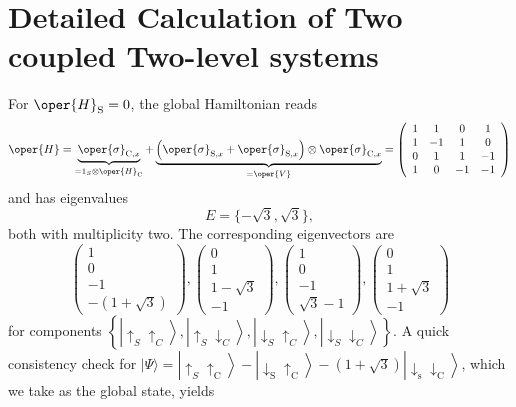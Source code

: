 \chapter{Detailed Calculation of Two coupled Two-level systems\label{app:chap3_appendix}}
For $\oper{H}_{\mathrm{S}}=0$, the global Hamiltonian reads
$$
\oper{H}=\underbrace{\oper{\sigma}_{\mathrm{C}, x}}_{=1_S \otimes \oper{H}_{\mathrm{C}}}+\underbrace{\left(\oper{\sigma}_{\mathrm{S}, x}+\oper{\sigma}_{\mathrm{S}, x}\right) \otimes \oper{\sigma}_{\mathrm{C}, x}}_{=\oper{V}}=\left(\begin{array}{cccc}
1 & 1 & 0 & 1 \\
1 & -1 & 1 & 0 \\
0 & 1 & 1 & -1 \\
1 & 0 & -1 & -1
\end{array}\right)
$$
and has eigenvalues
$$
E=\{-\sqrt{3}, \sqrt{3}\},
$$
both with multiplicity two. The corresponding eigenvectors are
$$
\left(\begin{array}{c}
1 \\
0 \\
-1 \\
-(1+\sqrt{3})
\end{array}\right),\left(\begin{array}{c}
0 \\
1 \\
1-\sqrt{3} \\
-1
\end{array}\right),\left(\begin{array}{c}
1 \\
0 \\
-1 \\
\sqrt{3}-1
\end{array}\right),\left(\begin{array}{c}
0 \\
1 \\
1+\sqrt{3} \\
-1
\end{array}\right)
$$
for components $\left\{\left|\uparrow_S \uparrow_C\right\rangle,\left|\uparrow_S \downarrow_C\right\rangle,\left|\downarrow_S \uparrow_C\right\rangle,\left|\downarrow_S \downarrow_C\right\rangle\right\}$. A quick consistency check for $|\Psi\rangle=\left|\uparrow_S \uparrow_{\mathrm{C}}\right\rangle-\left|\downarrow_{\mathrm{S}} \uparrow_{\mathrm{C}}\right\rangle-(1+\sqrt{3})\left|\downarrow_{\mathrm{s}} \downarrow_{\mathrm{C}}\right\rangle$, which we take as the global state, yields
